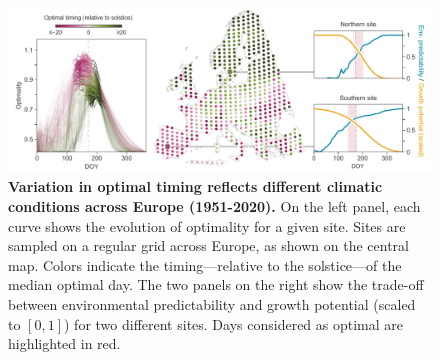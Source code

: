 \documentclass[11pt,letter]{article}
\begin{document}
\begin{figure}[h]
\hspace*{-1.2cm}
\includegraphics{local_optimality_alt.pdf}
\vspace*{-0.7cm}
\caption{\textbf{Variation in optimal timing reflects different climatic conditions across Europe (1951-2020).} On the left panel, each curve shows the evolution of optimality for a given site. Sites are sampled on a regular grid across Europe, as shown on the central map. Colors indicate the timing---relative to the solstice---of the median optimal day. The two panels on the right show the trade-off between environmental predictability and growth potential (scaled to $[0,1]$) for two different sites. Days considered as optimal are highlighted in red.}
\label{fig:localoptimality}
\end{figure}

\clearpage

\end{document}
